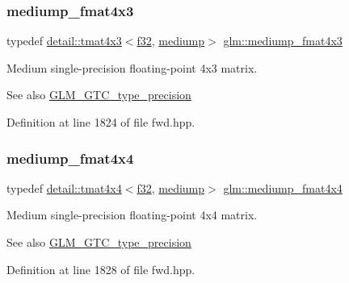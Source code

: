 \subsubsection{\texorpdfstring{mediump\+\_\+fmat4x3}{mediump\_fmat4x3}}
{\footnotesize\ttfamily typedef \hyperlink{structglm_1_1detail_1_1tmat4x3}{detail\+::tmat4x3}$<$\hyperlink{group__gtc__type__precision_ga0ec999b57f5330d9021256e96038df04}{f32}, \hyperlink{namespaceglm_a0f04f086094c747d227af4425893f545a6416f3ea0c9025fb21ed50c4d6620482}{mediump}$>$ \hyperlink{group__gtc__type__precision_ga5e5de428d1e1da2c593a6245d92dd8c0}{glm\+::mediump\+\_\+fmat4x3}}

Medium single-\/precision floating-\/point 4x3 matrix. \begin{DoxySeeAlso}{See also}
\hyperlink{group__gtc__type__precision}{G\+L\+M\+\_\+\+G\+T\+C\+\_\+type\+\_\+precision} 
\end{DoxySeeAlso}


Definition at line 1824 of file fwd.\+hpp.

\mbox{\label{group__gtc__type__precision_ga7f4ae9d05ca94005a0b7d8e3c59943cd}} 
\subsubsection{\texorpdfstring{mediump\+\_\+fmat4x4}{mediump\_fmat4x4}}
{\footnotesize\ttfamily typedef \hyperlink{structglm_1_1detail_1_1tmat4x4}{detail\+::tmat4x4}$<$\hyperlink{group__gtc__type__precision_ga0ec999b57f5330d9021256e96038df04}{f32}, \hyperlink{namespaceglm_a0f04f086094c747d227af4425893f545a6416f3ea0c9025fb21ed50c4d6620482}{mediump}$>$ \hyperlink{group__gtc__type__precision_ga7f4ae9d05ca94005a0b7d8e3c59943cd}{glm\+::mediump\+\_\+fmat4x4}}

Medium single-\/precision floating-\/point 4x4 matrix. \begin{DoxySeeAlso}{See also}
\hyperlink{group__gtc__type__precision}{G\+L\+M\+\_\+\+G\+T\+C\+\_\+type\+\_\+precision} 
\end{DoxySeeAlso}


Definition at line 1828 of file fwd.\+hpp.

\mbox{\label{group__gtc__type__precision_ga4534af301d5260974cee29f76842d579}} 
